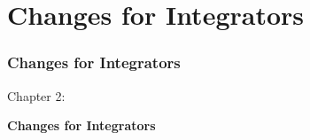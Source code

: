 %

\section{Changes for Integrators}
\begin{frame}[fragile]
	\frametitle{Changes for Integrators}

	\begin{center}\huge{Chapter 2:}\end{center}
	\begin{center}\huge{\color{typo3darkgrey}\textbf{Changes for Integrators}}\end{center}

\end{frame}



